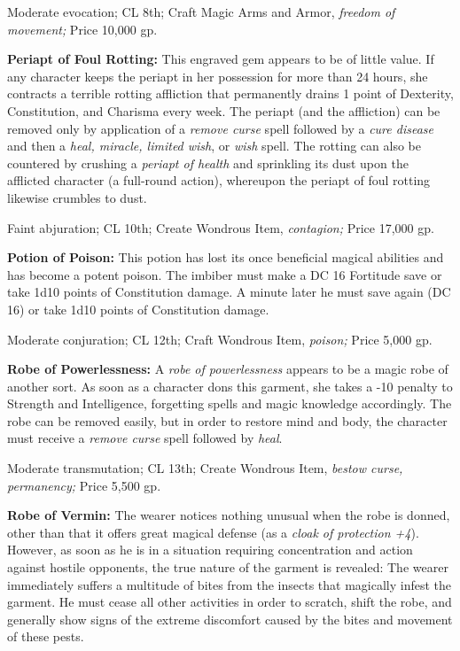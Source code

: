 Moderate evocation; CL 8th; Craft Magic Arms and Armor, \textit{freedom of movement; 
}Price 10,000 gp.

\textbf{Periapt of Foul Rotting:} This engraved gem appears to be of little value. 
If any character keeps the periapt in her possession for more than 24 hours, she 
contracts a terrible rotting affliction that permanently drains 1 point of Dexterity, 
Constitution, and Charisma every week. The periapt (and the affliction) can be 
removed only by application of a \textit{remove curse }spell followed by a \textit{cure 
disease }and then a \textit{heal, miracle, limited wish}, or \textit{wish }spell. 
The rotting can also be countered by crushing a \textit{periapt of health }and 
sprinkling its dust upon the afflicted character (a full-round action), whereupon 
the periapt of foul rotting likewise crumbles to dust.

Faint abjuration; CL 10th; Create Wondrous Item, \textit{contagion; }Price 17,000 
gp.

\textbf{Potion of Poison:} This potion has lost its once beneficial magical abilities 
and has become a potent poison. The imbiber must make a DC 16 Fortitude save or 
take 1d10 points of Constitution damage. A minute later he must save again (DC 
16) or take 1d10 points of Constitution damage.

Moderate conjuration; CL 12th; Craft Wondrous Item, \textit{poison; }Price 5,000 
gp.

\textbf{Robe of Powerlessness: }A \textit{robe of powerlessness }appears to be 
a magic robe of another sort. As soon as a character dons this garment, she takes 
a -10 penalty to Strength and Intelligence, forgetting spells and magic knowledge 
accordingly. The robe can be removed easily, but in order to restore mind and body, 
the character must receive a \textit{remove curse }spell followed by \textit{heal}.

Moderate transmutation; CL 13th; Create Wondrous Item, \textit{bestow curse, permanency; 
}Price 5,500 gp.

\textbf{Robe of Vermin:} The wearer notices nothing unusual when the robe is donned, 
other than that it offers great magical defense (as a \textit{cloak of protection 
+4}). However, as soon as he is in a situation requiring concentration and action 
against hostile opponents, the true nature of the garment is revealed: The wearer 
immediately suffers a multitude of bites from the insects that magically infest 
the garment. He must cease all other activities in order to scratch, shift the 
robe, and generally show signs of the extreme discomfort caused by the bites and 
movement of these pests.

